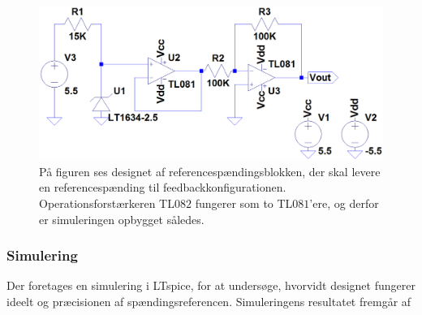 \begin{figure}[H]
	\centering
	\includegraphics[scale=0.4]{figures/cProblemloesning/Reference_komparator.PNG}
	\caption{På figuren ses designet af referencespændingsblokken, der skal levere en referencespænding til feedbackkonfigurationen. Operationsforstærkeren TL$082$ fungerer som to TL$081$'ere, og derfor er simuleringen opbygget således. \cite{Corporation2013}}
	\label{fig:ref_komparator}
\end{figure}

\subsubsection{Simulering}
Der foretages en simulering i LTspice, for at undersøge, hvorvidt designet fungerer ideelt og præcisionen af spændingsreferencen. Simuleringens resultatet fremgår af 

